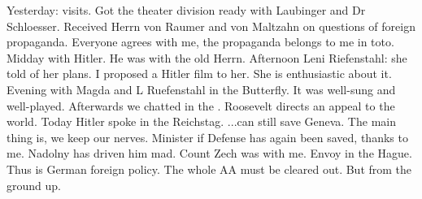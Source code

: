 Yesterday: visits. Got the theater division ready with Laubinger and Dr Schloesser. Received Herrn von Raumer and von Maltzahn on questions of foreign propaganda. Everyone agrees with me, the propaganda belongs to me in toto. Midday with Hitler. He was with the old Herrn.  Afternoon Leni Riefenstahl: she told of her plans. I proposed a Hitler film to her. She is enthusiastic about it. Evening with Magda and L Ruefenstahl in the Butterfly. It was well-sung and well-played. Afterwards we chatted in the . Roosevelt directs an appeal to the world. Today Hitler spoke in the Reichstag. ...can still save Geneva. The main thing is, we keep our nerves. Minister if Defense has again been saved, thanks to me. Nadolny has driven him mad. Count Zech was with me. Envoy in the Hague. Thus is German foreign policy. The whole AA must be cleared out. But from the ground up. 

